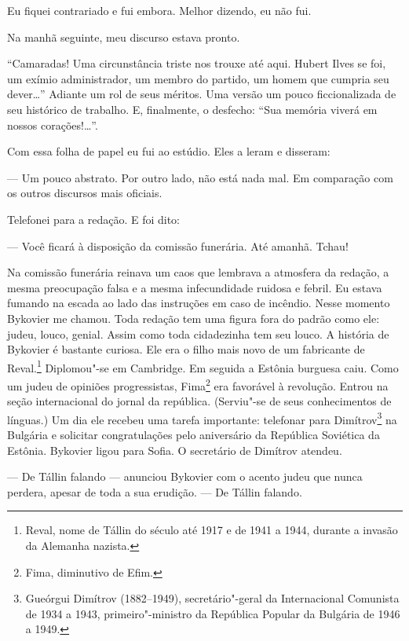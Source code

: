 Eu fiquei contrariado e fui embora. Melhor dizendo, eu não fui.

\bigskip

Na manhã seguinte, meu discurso estava pronto.

``Camaradas! Uma circunstância triste nos trouxe até aqui. Hubert Ilves
se foi, um exímio administrador, um membro do partido, um homem que
cumpria seu dever\ldots{}'' Adiante um rol de seus méritos. Uma versão um
pouco ficcionalizada de seu histórico de trabalho. E, finalmente, o
desfecho: ``Sua memória viverá em nossos corações!\ldots{}''.

Com essa folha de papel eu fui ao estúdio. Eles a leram e disseram:

--- Um pouco abstrato. Por outro lado, não está nada mal. Em comparação
com os outros discursos mais oficiais.

Telefonei para a redação. E foi dito:

--- Você ficará à disposição da comissão funerária. Até amanhã. Tchau!

\bigskip

Na comissão funerária reinava um caos que lembrava a atmosfera da
redação, a mesma preocupação falsa e a mesma infecundidade ruidosa e
febril. Eu estava fumando na escada ao lado das instruções em caso de
incêndio. Nesse momento Bykovier me chamou. Toda redação tem uma figura
fora do padrão como ele: judeu, louco, genial. Assim como toda
cidadezinha tem seu louco. A história de Bykovier é bastante curiosa.
Ele era o filho mais novo de um fabricante de Reval.\footnote{Reval,
  nome de Tállin do século  até 1917 e de 1941 a 1944, durante a
  invasão da Alemanha nazista.} Diplomou"-se em Cambridge. Em seguida a
Estônia burguesa caiu. Como um judeu de opiniões progressistas,
Fima\footnote{Fima, diminutivo de Efim.} era favorável à revolução.
Entrou na seção internacional do jornal da república. (Serviu"-se de seus
conhecimentos de línguas.) Um dia ele recebeu uma tarefa importante:
telefonar para Dimítrov\footnote{Gueórgui Dimítrov (1882--1949),
  secretário"-geral da Internacional Comunista de 1934 a 1943,
  primeiro"-ministro da República Popular da Bulgária de 1946 a 1949.} na
Bulgária e solicitar congratulações pelo aniversário da República
Soviética da Estônia. Bykovier ligou para Sofia. O secretário de
Dimítrov atendeu.

--- De Tállin falando --- anunciou Bykovier com o acento judeu que nunca
perdera, apesar de toda a sua erudição. --- De Tállin falando.

